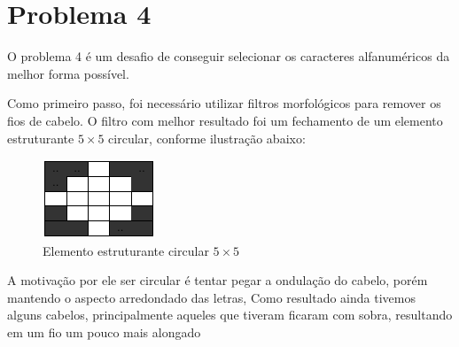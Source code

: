 \documentclass{article}
\begin{document}
	\section{Problema 4}
	
	O problema 4 é um desafio de conseguir selecionar os caracteres alfanuméricos da melhor forma possível.
	
	Como primeiro passo, foi necessário utilizar filtros morfológicos para remover os fios de cabelo. O filtro com melhor resultado foi um fechamento de um elemento estruturante $5 \times 5$ circular, conforme ilustração abaixo:
	
	\begin{figure}[H]
		\centering
		\includegraphics[scale=0.7]{images/4_struct.png}
		\caption{Elemento estruturante circular $5 \times 5$}
	\end{figure}
	
	A motivação por ele ser circular é tentar pegar a ondulação do cabelo, porém mantendo o aspecto arredondado das letras, Como resultado ainda tivemos alguns cabelos, principalmente aqueles que tiveram ficaram com sobra, resultando em um fio um pouco mais alongado
	
\end{document}
